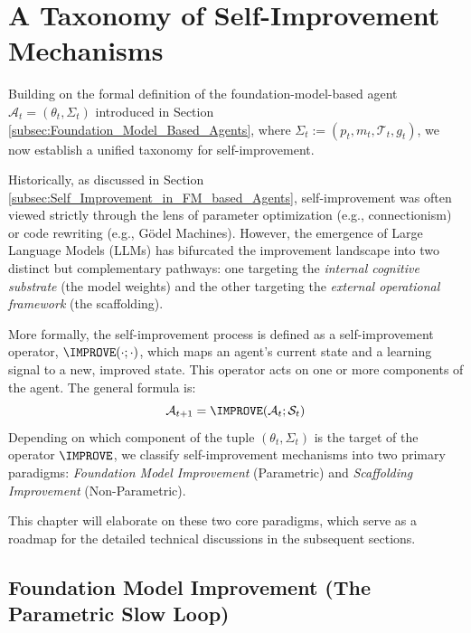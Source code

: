 
\section{A Taxonomy of Self-Improvement Mechanisms}
\label{sec:A_Taxonomy_of_Self_Improvement_Mechanisms}

Building on the formal definition of the foundation-model-based agent $\mathcal{A}_{t}=(\theta_{t}, \Sigma_{t})$ introduced in Section \ref{subsec:Foundation_Model_Based_Agents}, where $\Sigma_{t} := (p_{t}, m_{t}, \mathcal{T}_{t}, g_{t})$, we now establish a unified taxonomy for self-improvement. 

Historically, as discussed in Section \ref{subsec:Self_Improvement_in_FM_based_Agents}, self-improvement was often viewed strictly through the lens of parameter optimization (e.g., connectionism) or code rewriting (e.g., Gödel Machines). However, the emergence of Large Language Models (LLMs) has bifurcated the improvement landscape into two distinct but complementary pathways: one targeting the \textit{internal cognitive substrate} (the model weights) and the other targeting the \textit{external operational framework} (the scaffolding).

More formally, the self-improvement process is defined as a self-improvement operator, $\IMPROVE(\cdot;\cdot)$, which maps an agent's current state and a learning signal to a new, improved state. This operator acts on one or more components of the agent. The general formula is:
\begin{equation}
    \mathcal{A}_{t+1} = \IMPROVE(\mathcal{A}_{t}; \mathcal{S}_{t})
\end{equation}
Depending on which component of the tuple $(\theta_{t}, \Sigma_{t})$ is the target of the operator $\IMPROVE$, we classify self-improvement mechanisms into two primary paradigms: \textit{Foundation Model Improvement} (Parametric) and \textit{Scaffolding Improvement} (Non-Parametric).

This chapter will elaborate on these two core paradigms, which serve as a roadmap for the detailed technical discussions in the subsequent sections.

\subsection{Foundation Model Improvement (The Parametric Slow Loop)}
\label{subsec:Foundation_Model_Improvement_(The_Parametric_Slow_Loop)}

